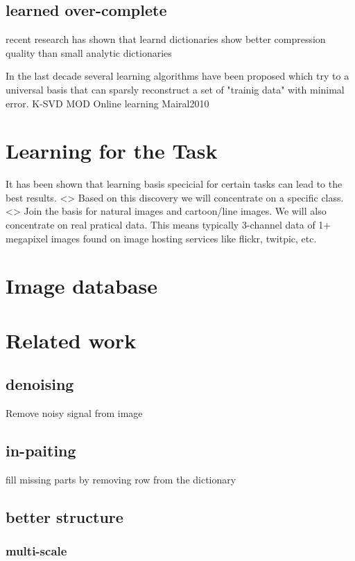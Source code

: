\subsection{learned over-complete}
recent research has shown that learnd dictionaries show better compression quality than small analytic dictionaries \cite{Aharon2006KSVD} \cite{Chen1998Atomic} 


In the last decade several learning algorithms have been proposed which try to a universal basis that 
can sparsly reconstruct a set of "trainig data" with minimal error. 
K-SVD
MOD
Online learning
Mairal2010

\section{Learning for the Task}
It has been shown that learning basis specicial for certain tasks can lead to the best results\cite{}.  <>
Based on this discovery we will concentrate on a specific class. <> Join the basis for natural images and cartoon/line images.
We will also concentrate on real pratical data. This means typically 3-channel data of 1+ megapixel images found on image hosting services like flickr, twitpic, etc.

\section{Image database}

\section{Related work}
\subsection{denoising}
Remove noisy signal from image

\subsection{in-paiting}
fill missing parts by removing row from the dictionary

\subsection{better structure}

\subsubsection{multi-scale}
